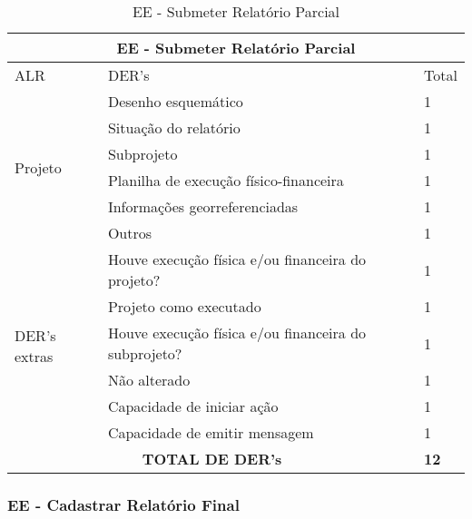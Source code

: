 \begin{table}[!h]
\centering
\caption{EE - Submeter Relatório Parcial}
\label{ee_submeter_relatorio_parcial}
\begin{tabular}{|l|l|l|}
\hline
\multicolumn{3}{|c|}{EE - Submeter Relatório Parcial}                                                                 \\ \hline
ALR                           & DER's                                                & Total              \\ \hline
\multirow{6}{*}{Projeto}    & Desenho esquemático  & 1                  \\ \cline{2-3} 
                             & Situação do relatório & 1 \\ \cline{2-3}
			      & Subprojeto & 1 \\ \cline{2-3}
                              & Planilha de execução físico-financeira               & 1                  \\ \cline{2-3} 
                              & Informações georreferenciadas                        & 1                  \\ \cline{2-3} 
                              & Outros  & 1                  \\ \hline
\multirow{6}{*}{DER's extras} & Houve execução física e/ou financeira do projeto? & 1                  \\ \cline{2-3} 
                              & Projeto como executado & 1 \\ \cline{2-3}
                              & Houve execução física e/ou financeira do subprojeto?    & 1                  \\ \cline{2-3} 
			      & Não alterado                                         & 1                  \\ \cline{2-3} 
                              & Capacidade de iniciar ação                           & 1\\ \cline{2-3}
                              & Capacidade de emitir mensagem                        &1                    \\ \hline
\multicolumn{2}{|c|}{\textbf{TOTAL DE DER's}}                                                 & \textbf{12}                 \\ \hline
\end{tabular}
\end{table}


\vfill
\pagebreak
  \subsubsection{EE - Cadastrar Relatório Final}
  
